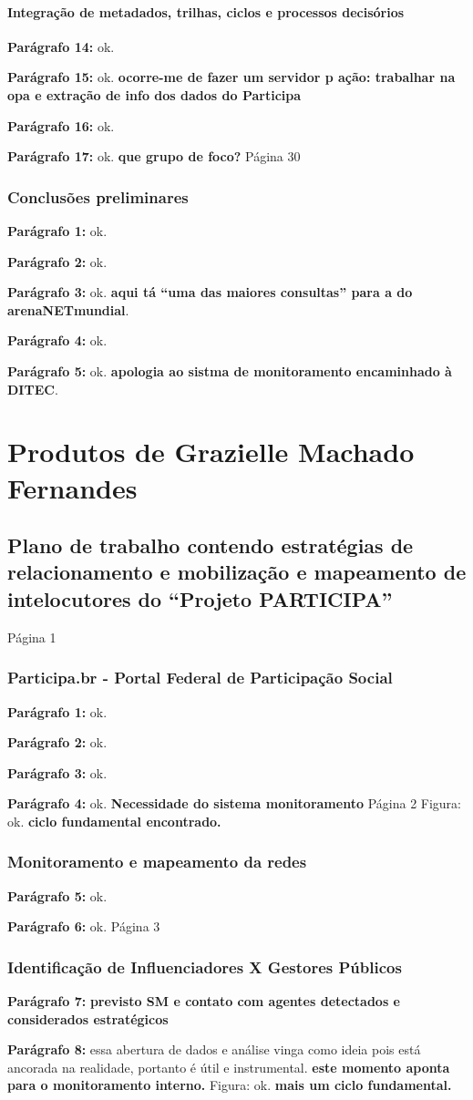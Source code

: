 \documentclass[12pt]{report}
\newcommand{\pp}[1]{

\textbf{Parágrafo #1:}
}
\begin{document}
\subsection{Integração de metadados, trilhas, ciclos e processos decisórios}
\pp{14} ok.
\pp{15} ok. {\bf \color{red} ocorre-me de fazer um servidor p ação: trabalhar na opa e extração de info dos dados do Participa}
\pp{16} ok.
\pp{17} ok. {\bf \color{red} que grupo de foco?}
\noindent Página 30
\section{Conclusões preliminares}
\pp{1} ok.
\pp{2} ok.
\pp{3} ok. {\bf \color{red} aqui tá ``uma das maiores consultas'' para a do arenaNETmundial}.
\pp{4} ok.
\pp{5} ok. {\bf \color{red} apologia ao sistma de monitoramento encaminhado à DITEC}.


\part{Produtos de Grazielle Machado Fernandes}
\chapter{Plano de trabalho contendo estratégias de relacionamento e mobilização e mapeamento de intelocutores do ``Projeto PARTICIPA''}
\noindent Página 1
\section{Participa.br - Portal Federal de Participação Social}
\pp{1} ok.
\pp{2} ok.
\pp{3} ok.
\pp{4} ok. {\bf \color{red} Necessidade do sistema monitoramento}
\noindent Página 2
Figura: ok. {\bf \color{red} ciclo fundamental encontrado.}
\section{Monitoramento e mapeamento da redes}
\pp{5} ok.
\pp{6} ok.
\noindent Página 3
\section{Identificação de Influenciadores X Gestores Públicos}
\pp{7} {\bf \color{red} previsto SM e contato com agentes detectados e considerados estratégicos}
\pp{8} essa abertura de dados e análise vinga como ideia pois está ancorada na realidade, portanto é útil e instrumental. {\bf \color{red} este momento aponta para o monitoramento interno.}
Figura: ok. {\bf \color{red} mais um ciclo fundamental.}
\end{document}
